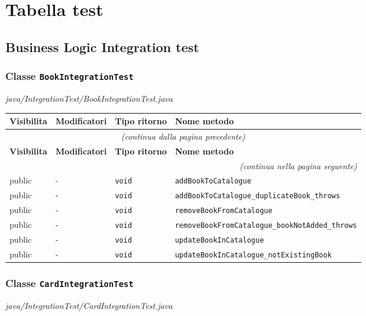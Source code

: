 \section*{Tabella test}\label{tabella_test}

\subsection*{Business Logic Integration test}\label{BL_IT}
\subsubsection*{Classe \texttt{BookIntegrationTest}}\label{BookIntegrationTest}
{\small\textit{java/IntegrationTest/BookIntegrationTest.java}}
\vspace{4pt}

\begin{longtable}{@{}llll@{}}
\toprule
\textbf{Visibilita} & \textbf{Modificatori} & \textbf{Tipo ritorno} & \textbf{Nome metodo} \\
\midrule
\endfirsthead
\multicolumn{4}{c}{\small\itshape (continua dalla pagina precedente)} \\
\toprule
\textbf{Visibilita} & \textbf{Modificatori} & \textbf{Tipo ritorno} & \textbf{Nome metodo} \\
\midrule
\endhead
\midrule
\multicolumn{4}{r}{\small\itshape (continua nella pagina seguente)} \\
\endfoot
\bottomrule
\endlastfoot
  public & - & \texttt{void} & \texttt{addBookToCatalogue} \\
  public & - & \texttt{void} & \texttt{addBookToCatalogue\_duplicateBook\_throws} \\
  public & - & \texttt{void} & \texttt{removeBookFromCatalogue} \\
  public & - & \texttt{void} & \texttt{removeBookFromCatalogue\_bookNotAdded\_throws} \\
  public & - & \texttt{void} & \texttt{updateBookInCatalogue} \\
  public & - & \texttt{void} & \texttt{updateBookInCatalogue\_notExistingBook} \\
\end{longtable}

\subsubsection*{Classe \texttt{CardIntegrationTest}}\label{CardIntegrationTest}
{\small\textit{java/IntegrationTest/CardIntegrationTest.java}}
\vspace{4pt}

